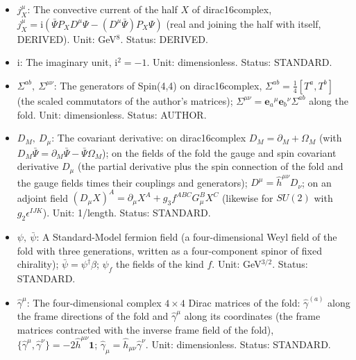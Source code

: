 \documentclass[
  10pt,
]{article}
\begin{document}
\begin{itemize}
  labels the currents that are the sources of the gauge fields. Unit:
  GeV\(^3\). Status: STANDARD.
\item
  \(j_X^\mu\): The convective current of the half \(X\) of
  dirac16complex,
  \(j_X^\mu = \mathrm{i}(\bar\Psi P_XD^\mu\Psi - (D^\mu\bar\Psi)P_X\Psi)\)
  (real and joining the half with itself, DERIVED). Unit: GeV\(^8\).
  Status: DERIVED.
\item
  \(\mathrm{i}\): The imaginary unit, \(\mathrm{i}^2 = -1\). Unit:
  dimensionless. Status: STANDARD.
\item
  \(\Sigma^{ab},\ \Sigma^{\mu\nu}\): The generators of Spin(4,4) on
  dirac16complex, \(\Sigma^{ab} = \frac14[T^a, T^b]\) (the scaled
  commutators of the author's matrices);
  \(\Sigma^{\mu\nu} = \mathbf{e}_a{}^\mu\mathbf{e}_b{}^\nu\Sigma^{ab}\)
  along the fold. Unit: dimensionless. Status: AUTHOR.
\item
  \(D_M,\ D_\mu\): The covariant derivative: on dirac16complex
  \(D_M = \partial_M + \Omega_M\) (with
  \(D_M\bar\Psi = \partial_M\bar\Psi - \bar\Psi\Omega_M\)); on the
  fields of the fold the gauge and spin covariant derivative \(D_\mu\)
  (the partial derivative plus the spin connection of the fold and the
  gauge fields times their couplings and generators);
  \(D^\mu = \hat h^{\mu\nu}D_\nu\); on an adjoint field
  \((D_\mu X)^A = \partial_\mu X^A + g_3f^{ABC}G^B_\mu X^C\) (likewise
  for \(SU(2)\) with \(g_2\epsilon^{IJK}\)). Unit: 1/length. Status:
  STANDARD.
\item
  \(\psi,\ \bar\psi\): A Standard-Model fermion field (a
  four-dimensional Weyl field of the fold with three generations,
  written as a four-component spinor of fixed chirality);
  \(\bar\psi = \psi^\dagger\beta\); \(\psi_f\) the fields of the kind
  \(f\). Unit: GeV\(^{3/2}\). Status: STANDARD.
\item
  \(\hat\gamma^\mu\): The four-dimensional complex \(4 \times 4\) Dirac
  matrices of the fold: \(\hat\gamma^{(a)}\) along the frame directions
  of the fold and \(\hat\gamma^\mu\) along its coordinates (the frame
  matrices contracted with the inverse frame field of the fold),
  \(\{\hat\gamma^\mu, \hat\gamma^\nu\} = -2\hat h^{\mu\nu}\mathbf{1}\);
  \(\hat\gamma_\mu = \hat h_{\mu\nu}\hat\gamma^\nu\). Unit:
  dimensionless. Status: STANDARD.
\end{itemize}
\end{document}
